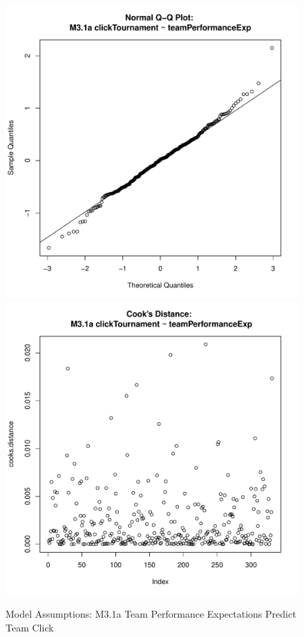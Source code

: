 \documentclass[12pt]{report}
\begin{document}
{\begin{figure}[htbp]
  \includegraphics[scale =.4]{../images/MLM31aQQNorm.pdf}
  \includegraphics[scale =.4]{../images/MLM31aCooksD.pdf}
  \caption{Model Assumptions: M3.1a Team Performance Expectations Predict Team Click}
  \label{fig:MLM31aTeamPerfExpClick}
\end{figure}



}
\end{document}
